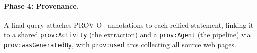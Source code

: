 
\paragraph{Phase 4: Provenance.}
\label{sec:construction:provenance}
A final query attaches PROV-O~\cite{provo} annotations to each reified statement, linking it to a shared \texttt{prov:Activity} (the extraction) and a \texttt{prov:Agent} (the pipeline) via \texttt{prov:wasGeneratedBy}, with \texttt{prov:used} arcs collecting all source web pages.

